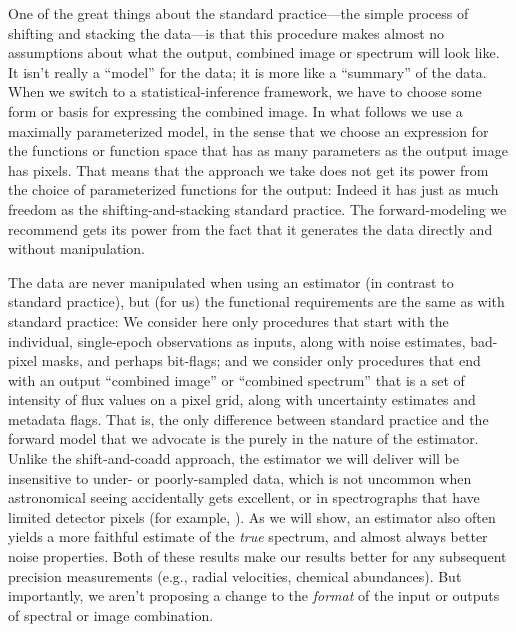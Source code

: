 \documentclass[modern]{aastex631}
\begin{document}
One of the great things about the standard practice---the simple process of shifting and stacking the data---is that this procedure makes almost no assumptions about what the output, combined image or spectrum will look like.
It isn't really a ``model'' for the data; it is more like a ``summary'' of the data.
When we switch to a statistical-inference framework, we have to choose some form or basis for expressing the combined image.
In what follows we use a maximally parameterized model, in the sense that we choose an expression for the functions or function space that has as many parameters as the output image has pixels.
That means that the approach we take does not get its power from the choice of parameterized functions for the output:
Indeed it has just as much freedom as the shifting-and-stacking standard practice.
The forward-modeling we recommend gets its power from the fact that it generates the data directly and without manipulation.

The data are never manipulated when using an estimator (in contrast to standard practice), but (for us) the functional requirements are the same as with standard practice:
We consider here only procedures that start with the individual, single-epoch observations as inputs, along with noise estimates, bad-pixel masks, and perhaps bit-flags; and we consider only procedures that end with an output ``combined image'' or ``combined spectrum'' that is a set of intensity of flux values on a pixel grid, along with uncertainty estimates and metadata flags.
That is, the only difference between standard practice and the forward model that we advocate is the purely in the nature of the estimator.
Unlike the shift-and-coadd approach, the estimator we will deliver will be insensitive to under- or poorly-sampled data, which is not uncommon when astronomical seeing accidentally gets excellent, or in spectrographs that have limited detector pixels (for example, \citealt{apogeehardware}).
As we will show, an estimator also often yields a more faithful estimate of the \emph{true} spectrum, and almost always better noise properties.
Both of these results make our results better for any subsequent precision measurements (e.g., radial velocities, chemical abundances).
But importantly, we aren't proposing a change to the \emph{format} of the input or outputs of spectral or image combination.

\end{document}
